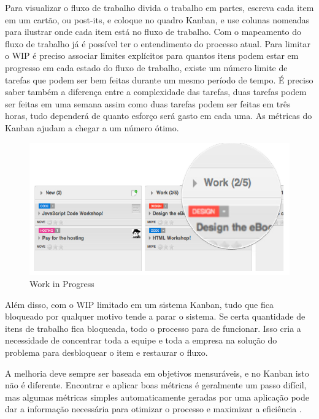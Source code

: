 Para visualizar o fluxo de trabalho divida o trabalho em partes, escreva cada item em um cartão, ou post-its, e coloque no quadro Kanban, e use colunas nomeadas para ilustrar onde cada item está no fluxo de trabalho. Com o mapeamento do fluxo de trabalho já é possível ter o entendimento do processo atual. 
Para limitar o WIP é preciso associar limites explícitos para quantos itens podem estar em progresso em cada estado do fluxo de trabalho, existe um número limite de tarefas que podem ser bem feitas durante um mesmo período de tempo. É preciso saber também a diferença entre a complexidade das tarefas, duas tarefas podem ser feitas em uma semana assim como duas tarefas podem ser feitas em três horas, tudo dependerá de quanto esforço será gasto em cada uma. As métricas do Kanban ajudam a chegar a um número ótimo.

\begin{figure}[h]
		\centering
		\label{fig05}
			\includegraphics[scale=0.5]{figuras/WIP.png}
		\caption{Work in Progress  \cite{klipp}}
\end{figure}


Além disso, com o WIP limitado em um sistema Kanban, tudo que fica bloqueado por qualquer motivo tende a parar o sistema. Se certa quantidade de itens de trabalho fica bloqueada, todo o processo para de funcionar. Isso cria a necessidade de concentrar toda a equipe e toda a empresa na solução do problema para desbloquear o item e restaurar o fluxo. 

A melhoria deve sempre ser baseada em objetivos mensuráveis, e no Kanban isto não é diferente. Encontrar e aplicar boas métricas é geralmente um passo difícil,  mas algumas métricas simples automaticamente geradas por uma aplicação pode dar a informação necessária para otimizar o processo e maximizar a eficiência \cite{klipp}. 

